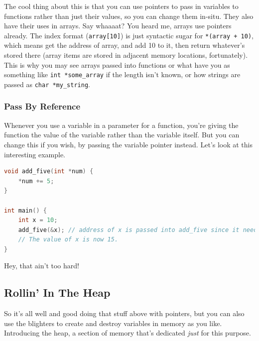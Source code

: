 The cool thing about this is that you can use pointers to pass in variables to functions rather than just their values, so you can change them in-situ. They also have their uses in arrays. Say whaaaat? You heard me, arrays use pointers already. The index format (\texttt{array[10]}) is just syntactic sugar for \texttt{*(array + 10)}, which means get the address of array, and add 10 to it, then return whatever's stored there (array items are stored in adjacent memory locations, fortunately). This is why you may see arrays passed into functions or what have you as something like \texttt{int *some\_array} if the length isn't known, or how strings are passed as \texttt{char *my\_string}.

\subsubsection{Pass By Reference}
Whenever you use a variable in a parameter for a function, you're giving the function the value of the variable rather than the variable itself. But you can change this if you wish, by passing the variable pointer instead. Let's look at this interesting example.
\begin{lstlisting}[language=C]
void add_five(int *num) {
    *num += 5;
}

int main() {
    int x = 10;
    add_five(&x); // address of x is passed into add_five since it needs a pointer.
    // The value of x is now 15.
}
\end{lstlisting}
Hey, that ain't too hard!

\subsection{Rollin' In The Heap}
So it's all well and good doing that stuff above with pointers, but you can also use the blighters to create and destroy variables in memory as you like. Introducing the heap, a section of memory that's dedicated \textit{just} for this purpose.
